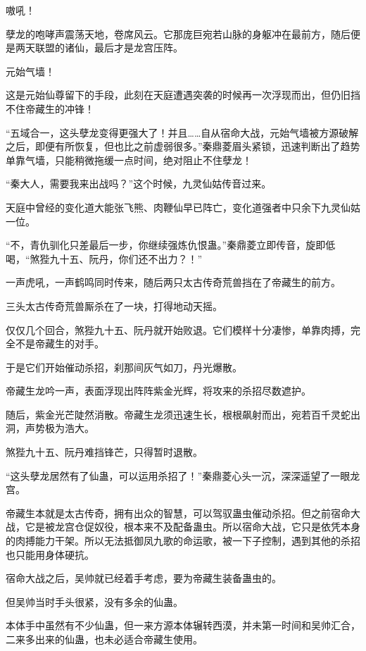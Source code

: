 
\begin{this_body}

嗷吼！

孽龙的咆哮声震荡天地，卷席风云。它那庞巨宛若山脉的身躯冲在最前方，随后便是两天联盟的诸仙，最后才是龙宫压阵。

元始气墙！

这是元始仙尊留下的手段，此刻在天庭遭遇突袭的时候再一次浮现而出，但仍旧挡不住帝藏生的冲锋！

“五域合一，这头孽龙变得更强大了！并且……自从宿命大战，元始气墙被方源破解之后，即便有所恢复，但也比之前虚弱很多。”秦鼎菱眉头紧锁，迅速判断出了趋势单靠气墙，只能稍微拖缓一点时间，绝对阻止不住孽龙！

“秦大人，需要我来出战吗？”这个时候，九灵仙姑传音过来。

天庭中曾经的变化道大能张飞熊、肉鞭仙早已阵亡，变化道强者中只余下九灵仙姑一位。

“不，青仇驯化只差最后一步，你继续强炼仇恨蛊。”秦鼎菱立即传音，旋即低喝，“煞狴九十五、阮丹，你们还不出力？！”

一声虎吼，一声鹤鸣同时传来，随后两只太古传奇荒兽挡在了帝藏生的前方。

三头太古传奇荒兽厮杀在了一块，打得地动天摇。

仅仅几个回合，煞狴九十五、阮丹就开始败退。它们模样十分凄惨，单靠肉搏，完全不是帝藏生的对手。

于是它们开始催动杀招，刹那间灰气如刀，丹光爆散。

帝藏生龙吟一声，表面浮现出阵阵紫金光辉，将攻来的杀招尽数遮护。

随后，紫金光芒陡然消散。帝藏生龙须迅速生长，根根飙射而出，宛若百千灵蛇出洞，声势极为浩大。

煞狴九十五、阮丹难挡锋芒，只得暂时退散。

“这头孽龙居然有了仙蛊，可以运用杀招了！”秦鼎菱心头一沉，深深遥望了一眼龙宫。

帝藏生本就是太古传奇，拥有出众的智慧，可以驾驭蛊虫催动杀招。但之前宿命大战，它是被龙宫仓促奴役，根本来不及配备蛊虫。所以宿命大战，它只是依凭本身的肉搏能力干架。所以无法抵御凤九歌的命运歌，被一下子控制，遇到其他的杀招也只能用身体硬抗。

宿命大战之后，吴帅就已经着手考虑，要为帝藏生装备蛊虫的。

但吴帅当时手头很紧，没有多余的仙蛊。

本体手中虽然有不少仙蛊，但一来方源本体辗转西漠，并未第一时间和吴帅汇合，二来多出来的仙蛊，也未必适合帝藏生使用。


\end{this_body}
